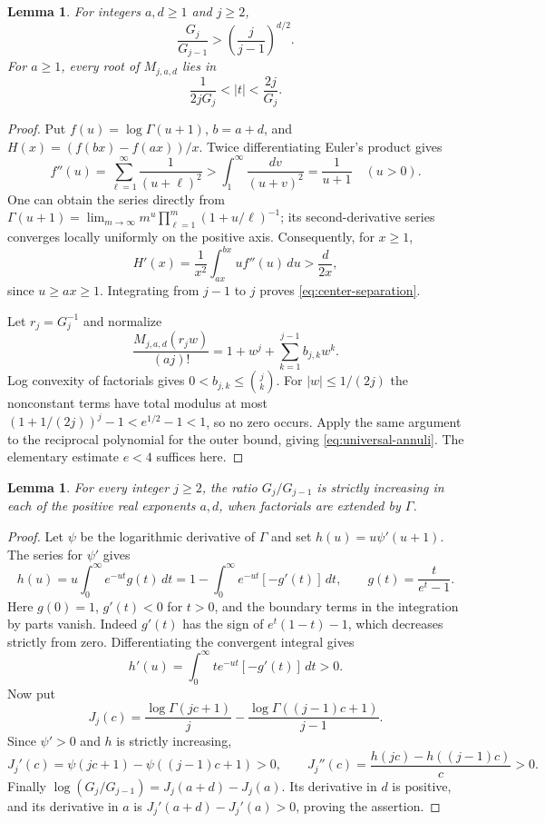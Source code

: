\documentclass[11pt]{article}
\newtheorem{lemma}[theorem]{Lemma}
\begin{document}
\begin{lemma}\label{lem:centers}
For integers $a,d\ge1$ and $j\ge2$,
\[
 \frac{G_j}{G_{j-1}}>
 \left(\frac{j}{j-1}\right)^{d/2}.                         \tag{3}\label{eq:center-separation}
\]
For $a\ge1$, every root of $M_{j,a,d}$ lies in
\[
 \frac1{2jG_j}<|t|<\frac{2j}{G_j}.                         \tag{4}\label{eq:universal-annuli}
\]
\end{lemma}
\begin{proof}
Put $f(u)=\log\Gamma(u+1)$, $b=a+d$, and
$H(x)=(f(bx)-f(ax))/x$. Twice differentiating Euler's product gives
\[
 f''(u)=\sum_{\ell=1}^{\infty}\frac1{(u+\ell)^2}>
 \int_1^\infty\frac{dv}{(u+v)^2}=\frac1{u+1}\quad(u>0).
\]
One can obtain the series directly from
$\Gamma(u+1)=\lim_{m\to\infty}m^u\prod_{\ell=1}^m
(1+u/\ell)^{-1}$; its second-derivative series converges locally
uniformly on the positive axis.
Consequently, for $x\ge1$,
\[
 H'(x)=\frac1{x^2}\int_{ax}^{bx}u f''(u)\,du
       >\frac{d}{2x},
\]
since $u\ge ax\ge1$. Integrating from $j-1$ to $j$ proves \eqref{eq:center-separation}.

Let $r_j=G_j^{-1}$ and normalize
\[
 \frac{M_{j,a,d}(r_jw)}{(aj)!}
 =1+w^j+\sum_{k=1}^{j-1}b_{j,k}w^k.
\]
Log convexity of factorials gives $0<b_{j,k}\le\binom jk$.
For $|w|\le1/(2j)$ the nonconstant terms have total modulus at most
$(1+1/(2j))^j-1<e^{1/2}-1<1$, so no zero occurs.
Apply the same argument to the reciprocal polynomial for the outer
bound, giving \eqref{eq:universal-annuli}. The elementary estimate $e<4$ suffices here.
\end{proof}

\begin{lemma}\label{lem:monotone-centers}
For every integer $j\ge2$, the ratio $G_j/G_{j-1}$ is strictly
increasing in each of the positive real exponents $a,d$, when
factorials are extended by $\Gamma$.
\end{lemma}
\begin{proof}
Let $\psi$ be the logarithmic derivative of $\Gamma$ and set
$h(u)=u\psi'(u+1)$.
The series for $\psi'$ gives
\[
 h(u)=u\int_0^\infty e^{-ut}g(t)\,dt
     =1-\int_0^\infty e^{-ut}[-g'(t)]\,dt,\qquad
 g(t)=\frac{t}{e^t-1}.
\]
Here $g(0)=1$, $g'(t)<0$ for $t>0$, and the boundary terms
in the integration by parts vanish. Indeed
$g'(t)$ has the sign of $e^t(1-t)-1$, which decreases strictly
from zero. Differentiating the convergent integral gives
\[
 h'(u)=\int_0^\infty t e^{-ut}[-g'(t)]\,dt>0.
\]
Now put
\[
 J_j(c)=\frac{\log\Gamma(jc+1)}j
       -\frac{\log\Gamma((j-1)c+1)}{j-1}.
\]
Since $\psi'>0$ and $h$ is strictly increasing,
\[
 J_j'(c)=\psi(jc+1)-\psi((j-1)c+1)>0,\qquad
 J_j''(c)=\frac{h(jc)-h((j-1)c)}c>0.
\]
Finally
$\log(G_j/G_{j-1})=J_j(a+d)-J_j(a)$.
Its derivative in $d$ is positive, and its derivative in $a$ is
$J_j'(a+d)-J_j'(a)>0$, proving the assertion.
\end{proof}
\end{document}
